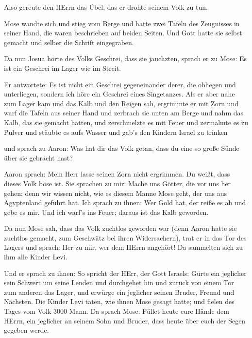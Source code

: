  Also gereute den HErrn das Übel, das er drohte seinem Volk
zu tun.

 Mose wandte sich und stieg vom Berge und hatte zwei Tafeln
des Zeugnisses in seiner Hand, die waren beschrieben auf beiden Seiten.
 Und Gott hatte sie selbst gemacht und selber die Schrift
eingegraben.

 Da nun Josua hörte des Volks Geschrei, dass sie jauchzten,
sprach er zu Mose: Es ist ein Geschrei im Lager wie im Streit.

 Er antwortete: Es ist nicht ein Geschrei gegeneinander
derer, die obliegen und unterliegen, sondern ich höre ein Geschrei eines
Singetanzes.  Als er aber nahe zum Lager kam und das Kalb
und den Reigen sah, ergrimmte er mit Zorn und warf die Tafeln aus seiner
Hand und zerbrach sie unten am Berge  und nahm das Kalb,
das sie gemacht hatten, und zerschmelzte es mit Feuer und zermalmte es
zu Pulver und stäubte es aufs Wasser und gab's den Kindern Israel zu
trinken

 und sprach zu Aaron: Was hat dir das Volk getan, dass du
eine so große Sünde über sie gebracht hast?

 Aaron sprach: Mein Herr lasse seinen Zorn nicht ergrimmen.
Du weißt, dass dieses Volk böse ist.  Sie sprachen zu mir:
Mache uns Götter, die vor uns her gehen; denn wir wissen nicht, wie es
diesem Manne Mose geht, der uns aus Ägyptenland geführt hat.
 Ich sprach zu ihnen: Wer Gold hat, der reiße es ab und
gebe es mir. Und ich warf's ins Feuer; daraus ist das Kalb geworden.

 Da nun Mose sah, dass das Volk zuchtlos geworden war (denn
Aaron hatte sie zuchtlos gemacht, zum Geschwätz bei ihren Widersachern),
 trat er in das Tor des Lagers und sprach: Her zu mir, wer
dem HErrn angehört! Da sammelten sich zu ihm alle Kinder Levi.

 Und er sprach zu ihnen: So spricht der HErr, der Gott
Israels: Gürte ein jeglicher sein Schwert um seine Lenden und durchgehet
hin und zurück von einem Tor zum anderen das Lager, und erwürge ein
jeglicher seinen Bruder, Freund und Nächsten.  Die Kinder
Levi taten, wie ihnen Mose gesagt hatte; und fielen des Tages vom Volk
3000 Mann.  Da sprach Mose: Füllet heute eure Hände dem
HErrn, ein jeglicher an seinem Sohn und Bruder, dass heute über euch der
Segen gegeben werde.


